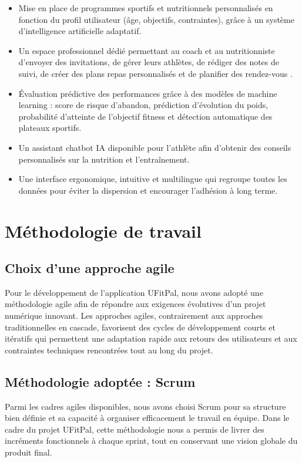 ﻿\documentclass[a4paper,12pt]{report}
\begin{document}
\begin{itemize}[label=$\star$]
\item  Mise en place de programmes sportifs et nutritionnels personnalisés en fonction du profil utilisateur (âge, objectifs, contraintes), 
grâce à un système d'intelligence artificielle adaptatif.

\item  Un espace professionnel dédié permettant au coach et au nutritionniste d'envoyer des invitations, de gérer leurs athlètes, 
de rédiger des notes de suivi, de créer des plans repas personnalisés et de planifier des rendez-vous .
\item Évaluation prédictive des performances grâce à des modèles de machine learning : score de risque d'abandon, prédiction d'évolution du poids, 
probabilité d'atteinte de l'objectif fitness et détection automatique des plateaux sportifs.
\item Un assistant chatbot IA disponible pour l'athlète afin d'obtenir des conseils personnalisés sur la nutrition et l'entraînement.
 \item Une interface ergonomique, intuitive et multilingue qui regroupe toutes les données pour éviter la dispersion et encourager l'adhésion à long terme.
\end{itemize}

\section{Méthodologie de travail}

\subsection{Choix d'une approche agile}
Pour le développement de l'application UFitPal, nous avons adopté une méthodologie agile afin de
 répondre aux exigences évolutives d'un projet numérique innovant. Les approches agiles, contrairement 
 aux approches traditionnelles en cascade, favorisent des cycles de développement courts et itératifs 
 qui permettent une adaptation rapide aux retours des utilisateurs et aux contraintes techniques rencontrées tout au long du projet.

\subsection{Méthodologie adoptée : Scrum}
Parmi les cadres agiles disponibles, nous avons choisi Scrum pour sa structure bien définie et sa capacité à organiser efficacement le travail en équipe.
 Dans le cadre du projet UFitPal, cette méthodologie nous a permis de livrer des incréments fonctionnels à chaque sprint,
  tout en conservant une vision globale du produit final.
\end{document}
